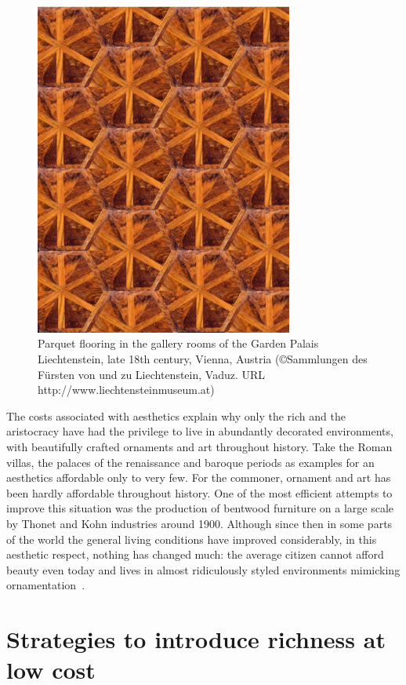 \documentclass[%
 reprint,
 showpacs,
 showkeys,
 amsmath,
 amssymb,
 aps,
 pra,
 longbibliography,
 floatfix,
 ]{revtex4-1}
\begin{document}
\begin{figure}
\centerline{\includegraphics[width=8.5cm]{2008-ae-parkett}}
   \caption{Parquet flooring  in the gallery rooms of the Garden Palais
 Liechtenstein, late 18th century, Vienna, Austria
(\copyright Sammlungen des F\"ursten von und zu Liechtenstein, Vaduz.
URL http://www.liechtensteinmuseum.at)}
   \label{2005-ae-flooring}
 \end{figure}



The costs associated with aesthetics explain why only the rich and the aristocracy have had the privilege to live in abundantly decorated environments, with beautifully crafted ornaments and art throughout history.
Take the Roman villas,  the palaces of the renaissance and baroque periods as examples for an aesthetics affordable only to very few.
For the commoner, ornament and art has been hardly affordable throughout history.
One of the most efficient attempts to improve this situation was the production of bentwood furniture on a large scale by Thonet and Kohn industries around 1900.
Although since then in some parts of the world the general living conditions have improved considerably, in this aesthetic respect, nothing has changed much:
the average citizen cannot afford beauty even today and lives in almost ridiculously styled environments mimicking ornamentation~\cite{koel-sack-dw}.



\section{Strategies to introduce richness at low cost}
\end{document}
